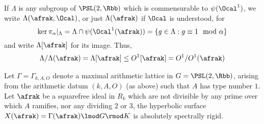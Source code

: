 If $\Lambda$ is any subgroup of $\PSL(2,\Rbb)$ which is commensurable to $\psi(\Ocal^1)$, we write $\Lambda(\afrak,\Ocal)$, or just $\Lambda(\afrak)$ if $\Ocal$ is understood, for
\[\ker \pi_\alpha \vert_\Lambda = \Lambda \cap \psi(\Ocal^1(\afrak)) =\{g \in \Lambda: g \equiv 1 \mod \alpha\}\]
and write $\Lambda[\afrak]$ for its image. Thus,
\begin{align*}
  \Lambda / \Lambda(\afrak) =	\Lambda[\afrak] \leq O^1[\afrak]= O^1/O^1(\afrak)
\end{align*}





\begin{thm}
  Let $\Gamma=\Gamma_{k,A,O}$ denote a maximal arithmetic lattice in $G=\PSL(2,\Rbb)$, arising from the arithmetic datum $(k,A,O)$ (as above) such that $A$ has type number $1$. Let $\afrak$ be a squarefree ideal in $R_k$ which are not divisible by any prime over which $A$ ramifies, nor any dividing $2$ or $3$, the hyperbolic surface $X(\afrak)=\Gamma(\afrak) \lmod G \rmod K$ is absolutely spectrally rigid.
\end{thm}

